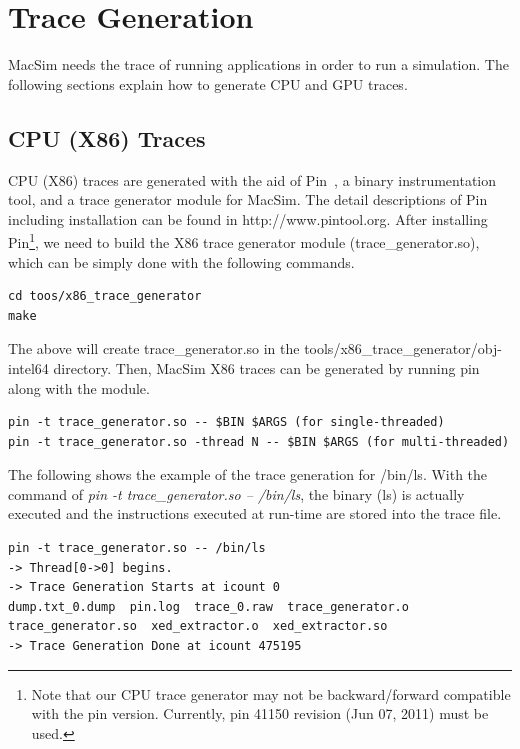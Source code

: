 
\clearpage
\section{Trace Generation}
\label{sec:trace_generation}

MacSim needs the trace of running applications in order to run a simulation.
The following sections explain how to generate CPU and GPU traces.

\subsection{CPU (X86) Traces}

CPU (X86) traces are generated with the aid of Pin~\cite{pin}, a binary instrumentation 
tool, and a trace generator module for MacSim.  The detail descriptions of Pin
including installation can be found in http://www.pintool.org.  After
installing Pin\footnote{Note that our CPU trace generator may not be
backward/forward compatible with the pin version. Currently, pin 41150
revision (Jun 07, 2011) must be used.}, we need to build the X86 trace
generator module (trace\_generator.so), which can be simply done with the following commands.

\smallskip
\begin{lstlisting}
cd toos/x86_trace_generator
make
\end{lstlisting}
\smallskip

The above will create trace\_generator.so in the tools/x86\_trace\_generator/obj-intel64 directory. 
Then, MacSim X86 traces can be generated by running pin along with the module. 

\smallskip
\begin{lstlisting}
pin -t trace_generator.so -- $BIN $ARGS (for single-threaded)
pin -t trace_generator.so -thread N -- $BIN $ARGS (for multi-threaded)
\end{lstlisting}
\smallskip

The following shows the example of the trace generation for /bin/ls. 
With the command of \emph{pin -t trace\_generator.so -- /bin/ls}, the binary (ls) is 
actually executed and the instructions executed at run-time are stored into the trace file.

\smallskip
\begin{lstlisting}
pin -t trace_generator.so -- /bin/ls
-> Thread[0->0] begins.
-> Trace Generation Starts at icount 0
dump.txt_0.dump  pin.log  trace_0.raw  trace_generator.o  trace_generator.so  xed_extractor.o  xed_extractor.so
-> Trace Generation Done at icount 475195
\end{lstlisting}
\smallskip

